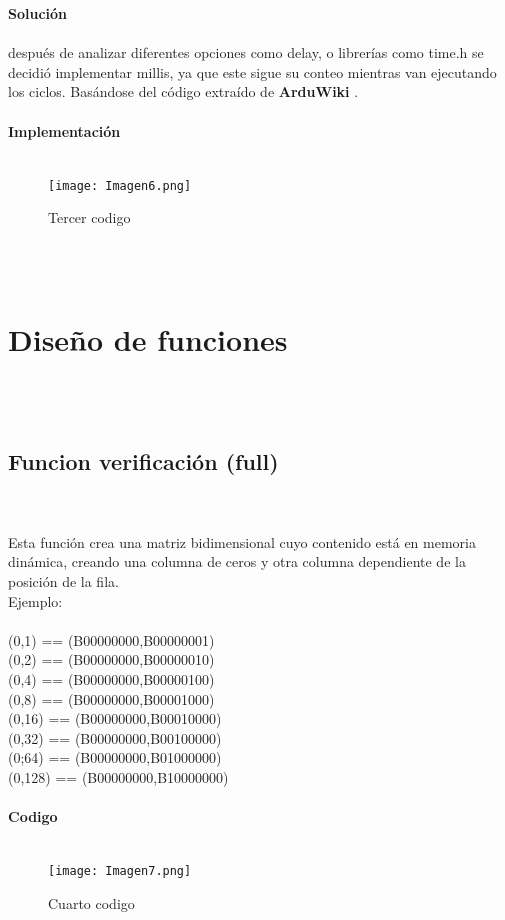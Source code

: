 \documentclass{article}
\begin{document}
\textbf{\large Solución}\\\\
después de analizar diferentes opciones como delay, o librerías como time.h se decidió implementar millis, ya que este sigue su conteo mientras van ejecutando los ciclos.
Basándose del código extraído de \textbf{ArduWiki} \cite{arduwiki}.\\\\

\textbf{\large Implementación}\\\\
\begin{figure}[h]
    \texttt{[image: Imagen6.png]}
    \centering
    \caption{Tercer codigo}
    \label{fig:Imagen6}
\end{figure}\\\\


\section{\large Diseño de funciones}\\\\
\subsection{\large Funcion verificación (full)}\\\\
Esta función crea una matriz bidimensional cuyo contenido está en memoria dinámica, creando una columna de ceros y otra columna dependiente de la posición de la fila.\\
Ejemplo:\\\\
(0,1) == (B00000000,B00000001)\\
(0,2) == (B00000000,B00000010) \\
(0,4) == (B00000000,B00000100) \\ 
(0,8) == (B00000000,B00001000) \\
(0,16) == (B00000000,B00010000) \\
(0,32) == (B00000000,B00100000) \\
(0;64) == (B00000000,B01000000) \\
(0,128) == (B00000000,B10000000) \\
\\
\textbf{\large Codigo}\\\\
\begin{figure}[h]
    \texttt{[image: Imagen7.png]}
    \centering
    \caption{Cuarto codigo}
    \label{fig:Imagen7}
\end{figure}\\\\
\end{document}
